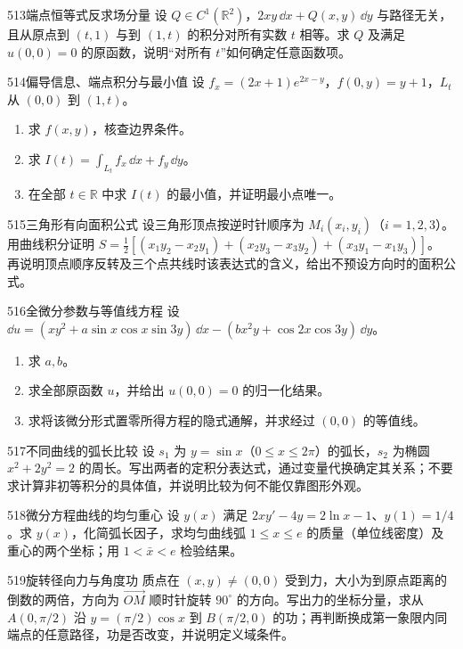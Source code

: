 \begin{exercise}{513}{端点恒等式反求场分量}
设 $Q\in C^1(\mathbb R^2)$，$2xy\,\dd x+Q(x,y)\,\dd y$ 与路径无关，且从原点到 $(t,1)$ 与到 $(1,t)$ 的积分对所有实数 $t$ 相等。求 $Q$ 及满足 $u(0,0)=0$ 的原函数，说明“对所有 $t$”如何确定任意函数项。
\end{exercise}

\begin{exercise}{514}{偏导信息、端点积分与最小值}
设 $f_x=(2x+1)e^{2x-y}$，$f(0,y)=y+1$，$L_t$ 从 $(0,0)$ 到 $(1,t)$。
\begin{enumerate}[label=(\arabic*)]
\item 求 $f(x,y)$，核查边界条件。
\item 求 $I(t)=\int_{L_t}f_x\,\dd x+f_y\,\dd y$。
\item 在全部 $t\in\mathbb R$ 中求 $I(t)$ 的最小值，并证明最小点唯一。
\end{enumerate}
\end{exercise}

\begin{exercise}{515}{三角形有向面积公式}
设三角形顶点按逆时针顺序为 $M_i(x_i,y_i)$（$i=1,2,3$）。用曲线积分证明
$S=\frac12[(x_1y_2-x_2y_1)+(x_2y_3-x_3y_2)+(x_3y_1-x_1y_3)]$。
再说明顶点顺序反转及三个点共线时该表达式的含义，给出不预设方向时的面积公式。
\end{exercise}

\begin{exercise}{516}{全微分参数与等值线方程}
设 $\dd u=(xy^2+a\sin x\cos x\sin3y)\,\dd x-(bx^2y+\cos2x\cos3y)\,\dd y$。
\begin{enumerate}[label=(\arabic*)]
\item 求 $a,b$。
\item 求全部原函数 $u$，并给出 $u(0,0)=0$ 的归一化结果。
\item 求将该微分形式置零所得方程的隐式通解，并求经过 $(0,0)$ 的等值线。
\end{enumerate}
\end{exercise}

\begin{exercise}{517}{不同曲线的弧长比较}
设 $s_1$ 为 $y=\sin x$（$0\leq x\leq2\pi$）的弧长，$s_2$ 为椭圆 $x^2+2y^2=2$ 的周长。写出两者的定积分表达式，通过变量代换确定其关系；不要求计算非初等积分的具体值，并说明比较为何不能仅靠图形外观。
\end{exercise}

\begin{exercise}{518}{微分方程曲线的均匀重心}
设 $y(x)$ 满足 $2xy'-4y=2\ln x-1$、$y(1)=1/4$。求 $y(x)$，化简弧长因子，求均匀曲线弧 $1\leq x\leq e$ 的质量（单位线密度）及重心的两个坐标；用 $1<\bar x<e$ 检验结果。
\end{exercise}

\begin{exercise}{519}{旋转径向力与角度功}
质点在 $(x,y)\ne(0,0)$ 受到力，大小为到原点距离的倒数的两倍，方向为 $\overrightarrow{OM}$ 顺时针旋转 $90^\circ$ 的方向。写出力的坐标分量，求从 $A(0,\pi/2)$ 沿 $y=(\pi/2)\cos x$ 到 $B(\pi/2,0)$ 的功；再判断换成第一象限内同端点的任意路径，功是否改变，并说明定义域条件。
\end{exercise}

